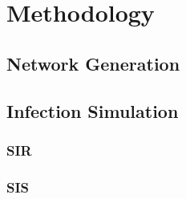 \section{Methodology}
\subsection{Network Generation}
\subsection{Infection Simulation}
\subsubsection{SIR}
\subsubsection{SIS}